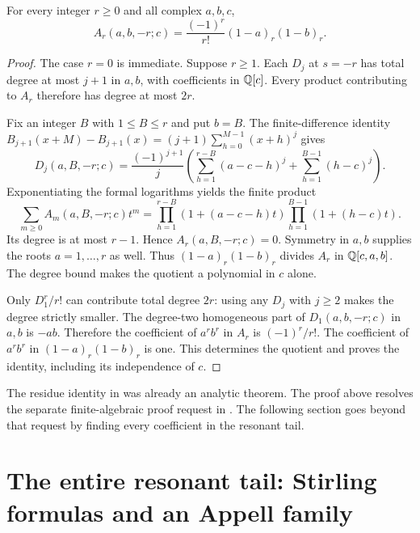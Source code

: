 \begin{theorem}
\label{agrc:residue}
For every integer $r\geq0$ and all complex $a,b,c$,
\begin{equation}\label{agrc:residue-formula}
 \boxed{\displaystyle
 A_r(a,b,-r;c)=\frac{(-1)^r}{r!}(1-a)_r(1-b)_r.}
\end{equation}
\end{theorem}
\begin{proof}
The case $r=0$ is immediate. Suppose $r\geq1$. Each $D_j$ at $s=-r$
has total degree at most $j+1$ in $a,b$, with coefficients in $\mathbb Q[c]$.
Every product contributing to $A_r$ therefore has degree at most $2r$.

Fix an integer $B$ with $1\leq B\leq r$ and put $b=B$.
The finite-difference identity
$B_{j+1}(x+M)-B_{j+1}(x)=(j+1)\sum_{h=0}^{M-1}(x+h)^j$
gives
\begin{equation}\label{agrc:D-root}
 D_j(a,B,-r;c)=\frac{(-1)^{j+1}}j
 \left(\sum_{h=1}^{r-B}(a-c-h)^j+
       \sum_{h=1}^{B-1}(h-c)^j\right).
\end{equation}
Exponentiating the formal logarithms yields the finite product
\begin{equation}\label{agrc:collapse}
 \sum_{m\geq0}A_m(a,B,-r;c)t^m
 =\prod_{h=1}^{r-B}(1+(a-c-h)t)
       \prod_{h=1}^{B-1}(1+(h-c)t).
\end{equation}
Its degree is at most $r-1$. Hence $A_r(a,B,-r;c)=0$.
Symmetry in $a,b$ supplies the roots $a=1,\ldots,r$ as well.
Thus $(1-a)_r(1-b)_r$ divides $A_r$ in $\mathbb Q[c,a,b]$.
The degree bound makes the quotient a polynomial in $c$ alone.

Only $D_1^r/r!$ can contribute total degree $2r$: using any $D_j$ with
$j\geq2$ makes the degree strictly smaller. The degree-two homogeneous
part of $D_1(a,b,-r;c)$ in $a,b$ is $-ab$. Therefore the coefficient
of $a^rb^r$ in $A_r$ is $(-1)^r/r!$. The coefficient of $a^rb^r$ in
$(1-a)_r(1-b)_r$ is one. This determines the quotient and proves the
identity, including its independence of $c$.
\end{proof}

\begin{remark}
The residue identity in \cite{repo-gauss} was already an analytic theorem.
The proof above resolves the separate finite-algebraic proof request in
\cite{repo-agenda}. The following section goes beyond that request by
finding every coefficient in the resonant tail.
\end{remark}

\section{The entire resonant tail: Stirling formulas and an Appell family}
\label{agrc:tail-section}

